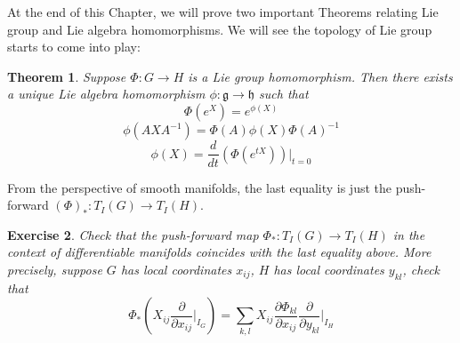 \documentclass[11pt]{book}
\newtheorem{theorem}{Theorem}[section]
\newtheorem{exercise}[theorem]{Exercise}
\newcommand{\mf}[1]{\mathfrak{#1}}
\begin{document}
\noindent At the end of this Chapter, we will prove two important Theorems relating Lie group and Lie algebra homomorphisms. We will see the topology of Lie group starts to come into play:
\begin{theorem} \label{gptoalg}
Suppose $\Phi:G \to H$ is a Lie group homomorphism. Then there exists a unique Lie algebra homomorphism $\phi: \mf{g} \to \mf{h}$ such that
$$\Phi(e^X) = e^{\phi(X)}$$
$$\phi(AXA^{-1}) = \Phi(A) \phi(X) \Phi(A)^{-1}$$
$$\phi(X) = \frac{d}{dt}(\Phi(e^{tX}))  \Big|_{t=0}$$
\end{theorem}
From the perspective of smooth manifolds, the last equality is just the push-forward $(\Phi)_* : T_I(G) \to T_I(H)$.
\begin{exercise}
Check that the push-forward map $\Phi_* : T_I(G) \to T_I(H)$ in the context of differentiable manifolds coincides with the last equality above. More precisely, suppose $G$ has local coordinates $x_{ij}$, $H$ has local coordinates $y_{kl}$, check that
$$\Phi_*(X_{ij} \frac{\partial}{\partial x_{ij}}  \Big|_{I_G}) = \sum_{k,l} X_{ij} \frac{\partial \Phi_{kl}}{\partial x_{ij}} \frac{\partial}{\partial y_{kl}}  \Big|_{I_H}$$
\end{exercise}
\end{document}
